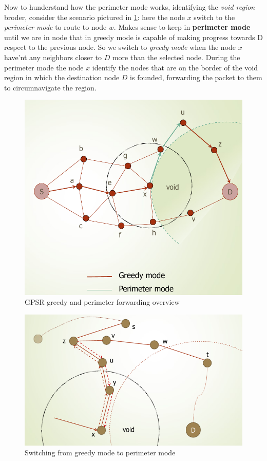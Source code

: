 \documentclass[10pt,a4paper]{report}
\theoremstyle{definition}
\begin{document}
Now to hunderstand how the perimeter mode works, identifying the \textit{void region} broder, consider the scenario pictured in \ref{gpsr-void-area}: here the node $x$ switch to the \textit{perimeter mode} to route to node $w$. Makes sense to keep in \textbf{perimeter mode} until we are in node that in greedy mode is capable of making progress towards D respect to the previous node.
So we switch to \textit{greedy mode} when the node $x$ have'nt any neighbors closer to $D$ more than the selected node.
During the perimeter mode the node $x$ identify the nodes that are on the border of the void region in which the destination node $D$ is founded, forwarding the packet to them to circumnavigate the region.
\begin{figure}[h!]
	\centering\includegraphics[scale=0.30]{images/Pasted image 20230523144654.png}
	\caption{GPSR greedy and perimeter forwarding overview}
	\label{gpsr-void-area}
\end{figure}


\begin{figure}[h]
	\centering\includegraphics[scale=0.40]{images/Pasted image 20230523150219.png}
	\caption{Switching from greedy mode to perimeter mode}
	\label{gpsr-loop-forwarding}
\end{figure}
\end{document}
